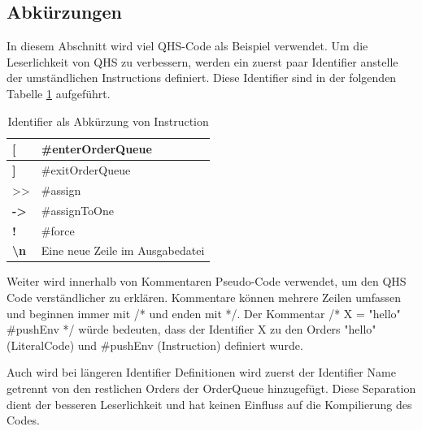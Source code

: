 \subsection{Abkürzungen}
In diesem Abschnitt wird viel QHS-Code als Beispiel verwendet.
Um die Leserlichkeit von QHS zu verbessern, werden ein zuerst paar Identifier anstelle der umständlichen Instructions definiert.
Diese Identifier sind in der folgenden Tabelle \ref{tab:shortcuts} aufgeführt.

{
\begin{table}[H]
    \centering
    \caption{Identifier als Abkürzung von Instruction}
    \vspace{3mm} %
    \label{tab:shortcuts}
    
    \begin{tabular}{>{\listingFont\selectfont}l|l}
    \textbf{{[}}                 & \#enterOrderQueue              \\ \hline
    \textbf{{]}}                 & \#exitOrderQueue               \\ \hline
    \textgreater{}\textgreater{} & \#assign                       \\ \hline
    \textbf{-\textgreater{}}     & \#assignToOne                  \\ \hline
    \textbf{!}                   & \#force                        \\ \hline
    \textbf{\textbackslash{}n}   & Eine neue Zeile im Ausgabedatei
    \end{tabular}
\end{table}
}

Weiter wird innerhalb von Kommentaren Pseudo-Code verwendet, um den QHS Code verständlicher zu erklären. Kommentare können mehrere Zeilen umfassen und beginnen immer mit /* und enden mit */.
Der Kommentar {\listingFont\selectfont /* X = "hello" \#pushEnv */} würde bedeuten, dass der Identifier X zu den Orders "hello" (LiteralCode) und \#pushEnv (Instruction) definiert wurde. 

Auch wird bei längeren Identifier Definitionen wird zuerst der Identifier Name getrennt von den restlichen Orders der OrderQueue hinzugefügt.
Diese Separation dient der besseren Leserlichkeit und hat keinen Einfluss auf die Kompilierung des Codes.

